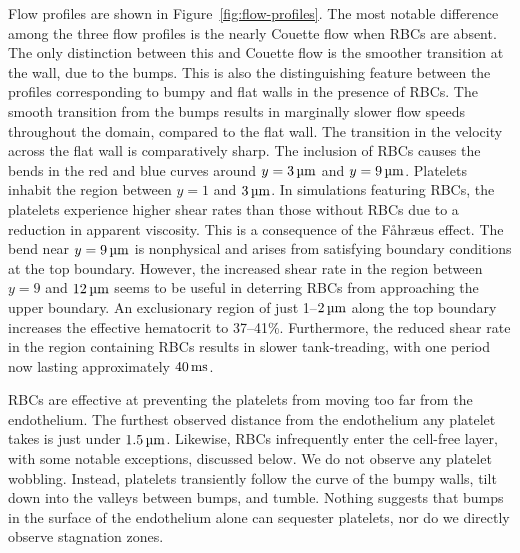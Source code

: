 Flow profiles are shown in Figure~\ref{fig:flow-profiles}. The most notable difference
among the three flow profiles is the nearly Couette flow when RBCs are absent. The only
distinction between this and Couette flow is the smoother transition at the wall, due to
the bumps. This is also the distinguishing feature between the profiles corresponding to
bumpy and flat walls in the presence of RBCs. The smooth transition from the bumps
results in marginally slower flow speeds throughout the domain, compared to the flat
wall. The transition in the velocity across the flat wall is comparatively sharp. The
inclusion of RBCs causes the bends in the red and blue curves around $y = 3\um$ and
$y = 9\um$. Platelets inhabit the region between $y=1$ and $3\um$. In simulations
featuring RBCs, the platelets experience higher shear rates than those without RBCs due
to a reduction in apparent viscosity. This is a consequence of the F\r{a}hr{\ae}us
effect. The bend near $y = 9\um$ is nonphysical and arises from satisfying boundary
conditions at the top boundary. However, the increased shear rate in the region between
$y=9$ and $12\um$ seems to be useful in deterring RBCs from approaching the upper
boundary. An exclusionary region of just 1--$2\um$ along the top boundary increases the
effective hematocrit to 37--41\%. Furthermore, the reduced shear rate in the region
containing RBCs results in slower tank-treading, with one period now lasting
approximately $40\ms$.

RBCs are effective at preventing the platelets from moving too far from the endothelium.
The furthest observed distance from the endothelium any platelet takes is just under
$1.5\um$. Likewise, RBCs infrequently enter the cell-free layer, with some notable
exceptions, discussed below. We do not observe any platelet wobbling. Instead, platelets
transiently follow the curve of the bumpy walls, tilt down into the valleys between
bumps, and tumble. Nothing suggests that bumps in the surface of the endothelium alone
can sequester platelets, nor do we directly observe stagnation zones.

